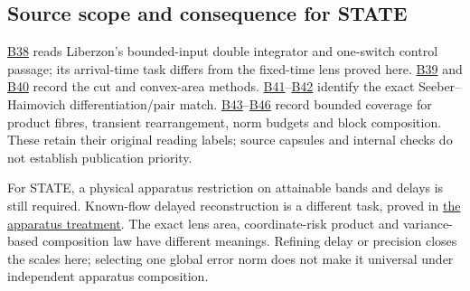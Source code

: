 \documentclass[11pt,a4paper]{article}
\begin{document}
\hypertarget{source-scope-and-consequence-for-state}{%
\subsection{Source scope and consequence for
STATE}\label{source-scope-and-consequence-for-state}}

\href{../references/batches/B38.md}{B38} reads Liberzon's bounded-input
double integrator and one-switch control passage; its arrival-time task
differs from the fixed-time lens proved here.
\href{../references/batches/B39.md}{B39} and
\href{../references/batches/B40.md}{B40} record the cut and convex-area
methods.
\href{../references/batches/B41.md}{B41}--\href{../references/batches/B42.md}{B42}
identify the exact Seeber--Haimovich differentiation/pair match.
\href{../references/batches/B43.md}{B43}--\href{../references/batches/B46.md}{B46}
record bounded coverage for product fibres, transient rearrangement,
norm budgets and block composition. These retain their original reading
labels; source capsules and internal checks do not establish publication
priority.

For STATE, a physical apparatus restriction on attainable bands and
delays is still required. Known-flow delayed reconstruction is a
different task, proved in \href{autonomous-finite-readout.md}{the
apparatus treatment}. The exact lens area, coordinate-risk product and
variance-based composition law have different meanings. Refining delay
or precision closes the scales here; selecting one global error norm
does not make it universal under independent apparatus composition.
\end{document}

